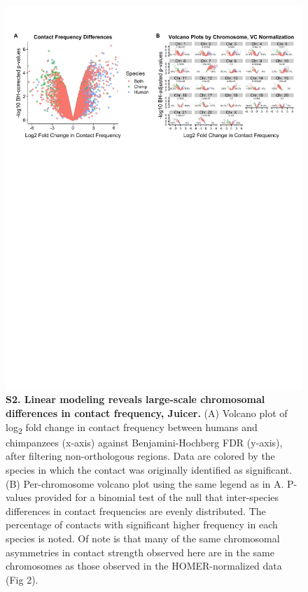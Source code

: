 \begin{figure}[!htb]
\centering
\includegraphics[width=6in]{img/figS2.pdf}
\caption[Linear modeling reveals large-scale chromosomal differences in contact frequency, Juicer.]{\textbf{S2. Linear modeling reveals large-scale chromosomal differences in contact frequency, Juicer.} (A) Volcano plot of log\textsubscript{2} fold change in contact frequency between humans and chimpanzees (x-axis) against Benjamini-Hochberg FDR (y-axis), after filtering non-orthologous regions. Data are colored by the species in which the contact was originally identified as significant. (B) Per-chromosome volcano plot using the same legend as in A. P-values provided for a binomial test of the null that inter-species differences in contact frequencies are evenly distributed. The percentage of contacts with significant higher frequency in each species is noted. Of note is that many of the same chromosomal asymmetries in contact strength observed here are in the same chromosomes as those observed in the HOMER-normalized data (Fig 2).}
\label{fig:ch02-figS2}
\end{figure}

